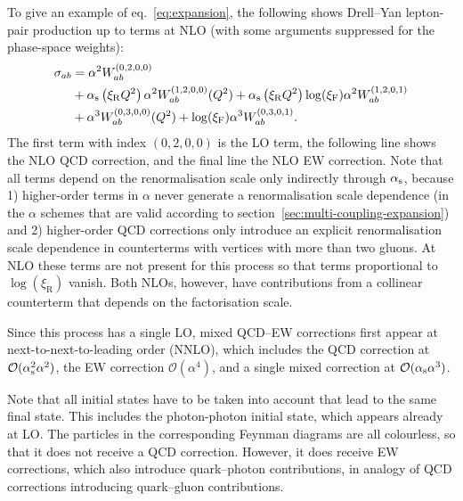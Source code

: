 To give an example of eq.~\eqref{eq:expansion}, the following shows Drell--Yan lepton-pair production up to terms at NLO (with some arguments suppressed for the phase-space weights):
\begin{equation}
\begin{split}
\sigma_{ab}
    &= \alpha^2 W_{ab}^{(0,2,0,0)} \\
    &+ \alpha_\mathrm{s} \left( \xi_\mathrm{R} Q^2 \right) \alpha^2 W_{ab}^{(1,2,0,0)} (Q^2) + \alpha_\mathrm{s} \left( \xi_\mathrm{R} Q^2 \right) \log (\xi_\mathrm{F}) \alpha^2 W_{ab}^{(1,2,0,1)} \\
    &+ \alpha^3 W_{ab}^{(0,3,0,0)} (Q^2) + \log (\xi_\mathrm{F}) \alpha^3 W_{ab}^{(0,3,0,1)} \text{.}
\end{split}
\end{equation}
The first term with index $(0,2,0,0)$ is the LO term, the following line shows the NLO QCD correction, and the final line the NLO EW correction.
Note that all terms depend on the renormalisation scale only indirectly through $\alpha_\mathrm{s}$, because 1) higher-order terms in $\alpha$ never generate a renormalisation scale dependence (in the $\alpha$ schemes that are valid according to section~\ref{sec:multi-coupling-expansion}) and 2) higher-order QCD corrections only introduce an explicit renormalisation scale dependence in counterterms with vertices with more than two gluons.
At NLO these terms are not present for this process so that terms proportional to $\log (\xi_\mathrm{R})$ vanish.
Both NLOs, however, have contributions from a collinear counterterm that depends on the factorisation scale.

Since this process has a single LO, mixed QCD--EW corrections first appear at next-to-next-to-leading order (NNLO), which includes the QCD correction at $\mathcal{O} (\alpha_\mathrm{s}^2 \alpha^2)$, the EW correction $\mathcal{O} (\alpha^4)$, and a single mixed correction at $\mathcal{O} (\alpha_\mathrm{s} \alpha^3)$.

Note that all initial states have to be taken into account that lead to the same final state.
This includes the photon-photon initial state, which appears already at LO.
The particles in the corresponding Feynman diagrams are all colourless, so that it does not receive a QCD correction.
However, it does receive EW corrections, which also introduce quark--photon contributions, in analogy of QCD corrections introducing quark--gluon contributions.

